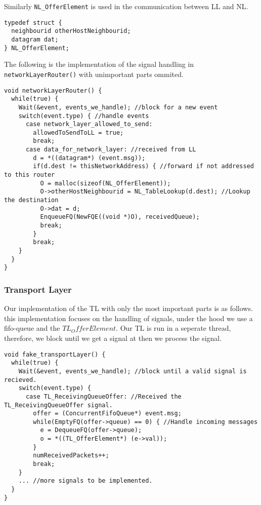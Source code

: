Similarly \texttt{NL\_OfferElement} is used in the communication between LL and NL.
\begin{lstlisting}
typedef struct {
  neighbourid otherHostNeighbourid;
  datagram dat;
} NL_OfferElement;
\end{lstlisting}

The following is the implementation of the signal handling in \texttt{networkLayerRouter()} with unimportant parts ommited.
\begin{lstlisting}
void networkLayerRouter() {
  while(true) {
    Wait(&event, events_we_handle); //block for a new event
    switch(event.type) { //handle events
      case network_layer_allowed_to_send:
        allowedToSendToLL = true;
        break;
      case data_for_network_layer: //received from LL
        d = *((datagram*) (event.msg));
        if(d.dest != thisNetworkAddress) { //forward if not addressed to this router
          O = malloc(sizeof(NL_OfferElement));
          O->otherHostNeighbourid = NL_TableLookup(d.dest); //Lookup the destination
          O->dat = d;
          EnqueueFQ(NewFQE((void *)O), receivedQueue);
          break;
        }
        break;
    }
  }
}
\end{lstlisting}



\subsubsection{Transport Layer}
Our implementation of the TL with only the most important parts is as follows.
this implementation focuses on the handling of signals, under the hood we use a fifo-queue and the $TL_OfferElement$.
Our TL is run in a seperate thread, therefore, we block until we get a signal at then we process the signal.
\begin{lstlisting}
void fake_transportLayer() {
  while(true) {
    Wait(&event, events_we_handle); //block until a valid signal is recieved.
    switch(event.type) {
      case TL_ReceivingQueueOffer: //Received the TL_ReceivingQueueOffer signal.
        offer = (ConcurrentFifoQueue*) event.msg;
        while(EmptyFQ(offer->queue) == 0) { //Handle incoming messages
          e = DequeueFQ(offer->queue);
          o = *((TL_OfferElement*) (e->val));
        }
        numReceivedPackets++;
        break;
    }
    ... //more signals to be implemented.
  }
}
\end{lstlisting}

